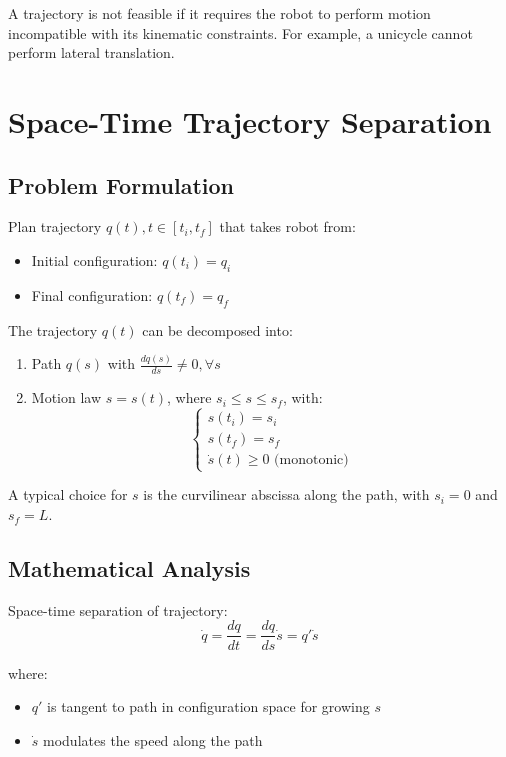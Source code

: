 \documentclass[openany]{book}
\theoremstyle{definition}
\theoremstyle{remark}
\newcommand{\definitionbox}[1]{
\begin{tcolorbox}[colback=blue!5,colframe=blue!40!black,title=Definition]
 #1
\end{tcolorbox}
}
\newcommand{\note}[1]{
\begin{tcolorbox}[colback=green!5,colframe=green!40!black,title=Note]
 #1
\end{tcolorbox}
}
\begin{document}
\definitionbox{A trajectory is not feasible if it requires the robot to perform motion incompatible with its kinematic constraints. For example, a unicycle cannot perform lateral translation.}

\section{Space-Time Trajectory Separation}

\subsection{Problem Formulation}
Plan trajectory $q(t), t \in [t_i, t_f]$ that takes robot from:
\begin{itemize}
    \item Initial configuration: $q(t_i) = q_i$
    \item Final configuration: $q(t_f) = q_f$
\end{itemize}

The trajectory $q(t)$ can be decomposed into:
\begin{enumerate}
    \item Path $q(s)$ with $\frac{dq(s)}{ds} \neq 0, \forall s$
    \item Motion law $s = s(t)$, where $s_i \leq s \leq s_f$, with:
        \begin{equation}
            \begin{cases}
                s(t_i) = s_i \\
                s(t_f) = s_f \\
                \dot{s}(t) \geq 0 \text{ (monotonic)}
            \end{cases}
        \end{equation}
\end{enumerate}

\note{A typical choice for $s$ is the curvilinear abscissa along the path, with $s_i = 0$ and $s_f = L$.}

\subsection{Mathematical Analysis}
Space-time separation of trajectory:
\begin{equation}
    \dot{q} = \frac{dq}{dt} = \frac{dq}{ds}\dot{s} = q'\dot{s}
\end{equation}

where:
\begin{itemize}
    \item $q'$ is tangent to path in configuration space for growing $s$
    \item $\dot{s}$ modulates the speed along the path
\end{itemize}
\end{document}
